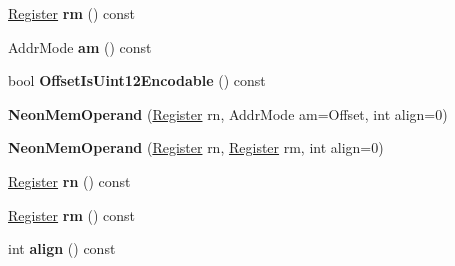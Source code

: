 \begin{DoxyCompactItemize}
\item 
\hyperlink{structv8_1_1internal_1_1_register}{Register} {\bfseries rm} () const \hypertarget{classv8_1_1internal_1_1_b_a_s_e___e_m_b_e_d_d_e_d_a3b52dc72ba96afd1a2469b5e3e490851}{}\label{classv8_1_1internal_1_1_b_a_s_e___e_m_b_e_d_d_e_d_a3b52dc72ba96afd1a2469b5e3e490851}

\item 
Addr\+Mode {\bfseries am} () const \hypertarget{classv8_1_1internal_1_1_b_a_s_e___e_m_b_e_d_d_e_d_a7b81c194f6f37dec4c34ecac3d7ce6b7}{}\label{classv8_1_1internal_1_1_b_a_s_e___e_m_b_e_d_d_e_d_a7b81c194f6f37dec4c34ecac3d7ce6b7}

\item 
bool {\bfseries Offset\+Is\+Uint12\+Encodable} () const \hypertarget{classv8_1_1internal_1_1_b_a_s_e___e_m_b_e_d_d_e_d_ac908f91d50f455c1dd40218470616a66}{}\label{classv8_1_1internal_1_1_b_a_s_e___e_m_b_e_d_d_e_d_ac908f91d50f455c1dd40218470616a66}

\item 
{\bfseries Neon\+Mem\+Operand} (\hyperlink{structv8_1_1internal_1_1_register}{Register} rn, Addr\+Mode am=Offset, int align=0)\hypertarget{classv8_1_1internal_1_1_b_a_s_e___e_m_b_e_d_d_e_d_a5580b5fd26392f128b6cf84dc5da5398}{}\label{classv8_1_1internal_1_1_b_a_s_e___e_m_b_e_d_d_e_d_a5580b5fd26392f128b6cf84dc5da5398}

\item 
{\bfseries Neon\+Mem\+Operand} (\hyperlink{structv8_1_1internal_1_1_register}{Register} rn, \hyperlink{structv8_1_1internal_1_1_register}{Register} rm, int align=0)\hypertarget{classv8_1_1internal_1_1_b_a_s_e___e_m_b_e_d_d_e_d_aa3d83f78ff640fa491e9a0bc8c05b2aa}{}\label{classv8_1_1internal_1_1_b_a_s_e___e_m_b_e_d_d_e_d_aa3d83f78ff640fa491e9a0bc8c05b2aa}

\item 
\hyperlink{structv8_1_1internal_1_1_register}{Register} {\bfseries rn} () const \hypertarget{classv8_1_1internal_1_1_b_a_s_e___e_m_b_e_d_d_e_d_aafc174fa57af8711b06f3b0e356c070c}{}\label{classv8_1_1internal_1_1_b_a_s_e___e_m_b_e_d_d_e_d_aafc174fa57af8711b06f3b0e356c070c}

\item 
\hyperlink{structv8_1_1internal_1_1_register}{Register} {\bfseries rm} () const \hypertarget{classv8_1_1internal_1_1_b_a_s_e___e_m_b_e_d_d_e_d_a3b52dc72ba96afd1a2469b5e3e490851}{}\label{classv8_1_1internal_1_1_b_a_s_e___e_m_b_e_d_d_e_d_a3b52dc72ba96afd1a2469b5e3e490851}

\item 
int {\bfseries align} () const \hypertarget{classv8_1_1internal_1_1_b_a_s_e___e_m_b_e_d_d_e_d_af418a6169985106b92fa057cfc9dbcd1}{}\label{classv8_1_1internal_1_1_b_a_s_e___e_m_b_e_d_d_e_d_af418a6169985106b92fa057cfc9dbcd1}


\end{DoxyCompactItemize}
